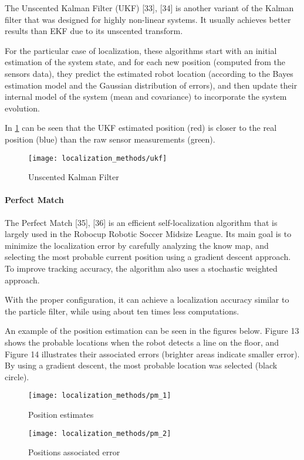 The Unscented Kalman Filter (UKF) [33], [34] is another variant of the Kalman filter that was designed for highly non-linear systems. It usually achieves better results than EKF due to its unscented transform.

For the particular case of localization, these algorithms start with an initial estimation of the system state, and for each new position (computed from the sensors data), they predict the estimated robot location (according to the Bayes estimation model and the Gaussian distribution of errors), and then update their internal model of the system (mean and covariance) to incorporate the system evolution.

In \cref{fig:localization-methods_ukf} can be seen that the UKF estimated position (red) is closer to the real position (blue) than the raw sensor measurements (green).

\begin{figure}[h]
	\centering
	\texttt{[image: localization\_methods/ukf]}
	\caption{Unscented Kalman Filter}
	\label{fig:localization-methods_ukf}
\end{figure}

\paragraph{Perfect Match}

The Perfect Match [35], [36] is an efficient self-localization algorithm that is largely used in the Robocup Robotic Soccer Midsize League. Its main goal is to minimize the localization error by carefully analyzing the know map, and selecting the most probable current position using a gradient descent approach. To improve tracking accuracy, the algorithm also uses a stochastic weighted approach.

With the proper configuration, it can achieve a localization accuracy similar to the particle filter, while using about ten times less computations.

An example of the position estimation can be seen in the figures below. Figure 13 shows the probable locations when the robot detects a line on the floor, and Figure 14 illustrates their associated errors (brighter areas indicate smaller error). By using a gradient descent, the most probable location was selected (black circle).

\begin{figure}
	\centering
	\begin{minipage}[h]{.49\textwidth}
		\centering
		\texttt{[image: localization\_methods/pm\_1]}
		\caption{Position estimates}
		\label{fig:localization-methods_pm-1}
	\end{minipage}\hfill
	\begin{minipage}[h]{.49\textwidth}
		\centering
		\texttt{[image: localization\_methods/pm\_2]}
		\caption{Positions associated error}
		\label{fig:localization-methods_pm-2}
	\end{minipage}
\end{figure}


